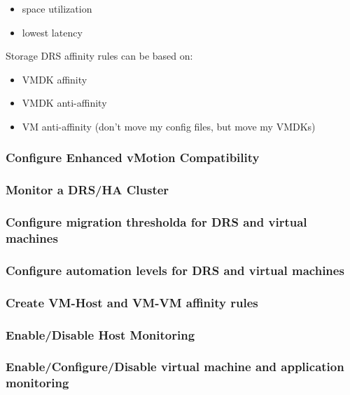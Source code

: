\begin{itemize}

\item space utilization
\item lowest latency

\end{itemize}

Storage DRS affinity rules can be based on:

\begin{itemize}

\item VMDK affinity
\item VMDK anti-affinity
\item VM anti-affinity (don't move my config files, but move my VMDKs)

\end{itemize}

\subsubsection{Configure Enhanced vMotion Compatibility}

\subsubsection{Monitor a DRS/HA Cluster}

\subsubsection{Configure migration thresholda for DRS and virtual machines}

\subsubsection{Configure automation levels for DRS and virtual machines}

\subsubsection{Create VM-Host and VM-VM affinity rules}

\subsubsection{Enable/Disable Host Monitoring}

\subsubsection{Enable/Configure/Disable virtual machine and application monitoring}


